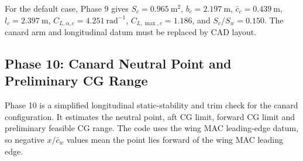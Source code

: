 For the default case, Phase 9 gives \(S_c=0.965~\mathrm{m^2}\), \(b_c=2.197~\mathrm{m}\), \(\bar{c}_c=0.439~\mathrm{m}\), \(l_c=2.397~\mathrm{m}\), \(C_{L,\alpha,c}=4.251~\mathrm{rad^{-1}}\), \(C_{L,\max,c}=1.186\), and \(S_c/S_w=0.150\). The canard arm and longitudinal datum must be replaced by CAD layout.

\subsection{Phase 10: Canard Neutral Point and Preliminary CG Range}
\label{subsec:ppa_phase10}

Phase 10 is a simplified longitudinal static-stability and trim check for the canard configuration. It estimates the neutral point, aft CG limit, forward CG limit and preliminary feasible CG range. The code uses the wing MAC leading-edge datum, so negative \(x/\bar{c}_w\) values mean the point lies forward of the wing MAC leading edge.

